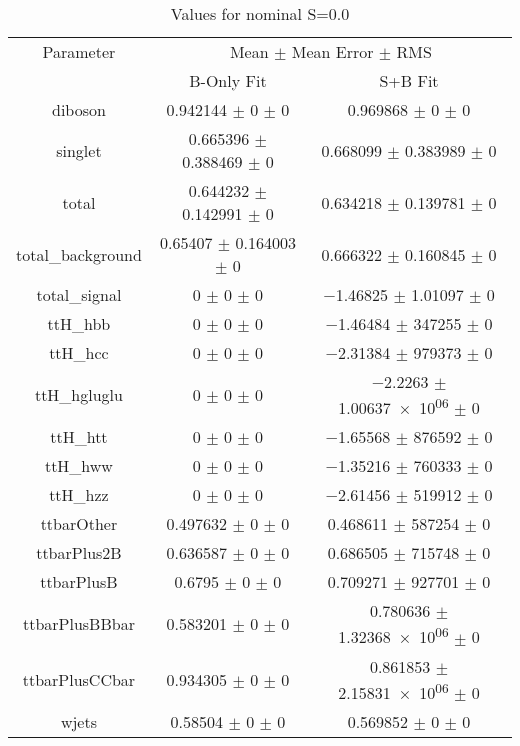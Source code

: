 \begin{table}
\centering
\caption{Values for nominal S=0.0}
\begin{tabular}{ccc}
\toprule
Parameter & \multicolumn{2}{c}{Mean $\pm$ Mean Error $\pm$ RMS}\\
 & B-Only Fit & S+B Fit\\
\midrule
diboson & \num{0.942144} $\pm$ \num{0} $\pm$ \num{0} & \num{0.969868} $\pm$ \num{0} $\pm$ \num{0}\\
singlet & \num{0.665396} $\pm$ \num{0.388469} $\pm$ \num{0} & \num{0.668099} $\pm$ \num{0.383989} $\pm$ \num{0}\\
total & \num{0.644232} $\pm$ \num{0.142991} $\pm$ \num{0} & \num{0.634218} $\pm$ \num{0.139781} $\pm$ \num{0}\\
total\_background & \num{0.65407} $\pm$ \num{0.164003} $\pm$ \num{0} & \num{0.666322} $\pm$ \num{0.160845} $\pm$ \num{0}\\
total\_signal & \num{0} $\pm$ \num{0} $\pm$ \num{0} & \num{-1.46825} $\pm$ \num{1.01097} $\pm$ \num{0}\\
ttH\_hbb & \num{0} $\pm$ \num{0} $\pm$ \num{0} & \num{-1.46484} $\pm$ \num{347255} $\pm$ \num{0}\\
ttH\_hcc & \num{0} $\pm$ \num{0} $\pm$ \num{0} & \num{-2.31384} $\pm$ \num{979373} $\pm$ \num{0}\\
ttH\_hgluglu & \num{0} $\pm$ \num{0} $\pm$ \num{0} & \num{-2.2263} $\pm$ \num{1.00637e+06} $\pm$ \num{0}\\
ttH\_htt & \num{0} $\pm$ \num{0} $\pm$ \num{0} & \num{-1.65568} $\pm$ \num{876592} $\pm$ \num{0}\\
ttH\_hww & \num{0} $\pm$ \num{0} $\pm$ \num{0} & \num{-1.35216} $\pm$ \num{760333} $\pm$ \num{0}\\
ttH\_hzz & \num{0} $\pm$ \num{0} $\pm$ \num{0} & \num{-2.61456} $\pm$ \num{519912} $\pm$ \num{0}\\
ttbarOther & \num{0.497632} $\pm$ \num{0} $\pm$ \num{0} & \num{0.468611} $\pm$ \num{587254} $\pm$ \num{0}\\
ttbarPlus2B & \num{0.636587} $\pm$ \num{0} $\pm$ \num{0} & \num{0.686505} $\pm$ \num{715748} $\pm$ \num{0}\\
ttbarPlusB & \num{0.6795} $\pm$ \num{0} $\pm$ \num{0} & \num{0.709271} $\pm$ \num{927701} $\pm$ \num{0}\\
ttbarPlusBBbar & \num{0.583201} $\pm$ \num{0} $\pm$ \num{0} & \num{0.780636} $\pm$ \num{1.32368e+06} $\pm$ \num{0}\\
ttbarPlusCCbar & \num{0.934305} $\pm$ \num{0} $\pm$ \num{0} & \num{0.861853} $\pm$ \num{2.15831e+06} $\pm$ \num{0}\\
wjets & \num{0.58504} $\pm$ \num{0} $\pm$ \num{0} & \num{0.569852} $\pm$ \num{0} $\pm$ \num{0}\\
\bottomrule
\end{tabular}
\end{table}